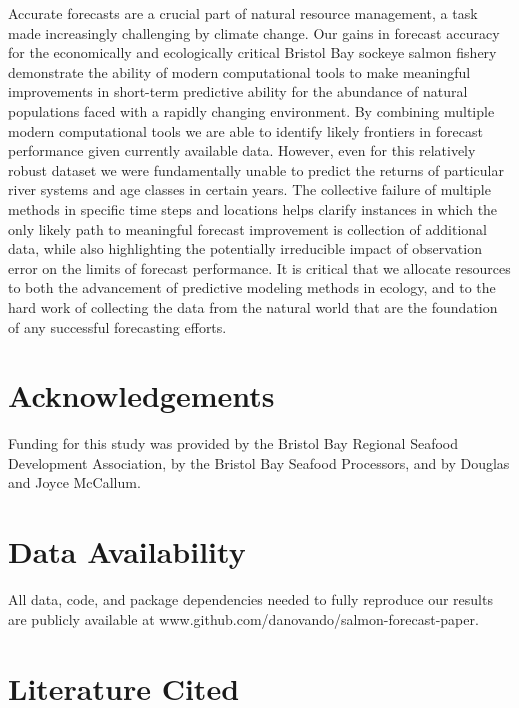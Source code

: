 \documentclass[
]{article}
\begin{document}
Accurate forecasts are a crucial part of natural resource management, a task made increasingly challenging by climate change. Our gains in forecast accuracy for the economically and ecologically critical Bristol Bay sockeye salmon fishery demonstrate the ability of modern computational tools to make meaningful improvements in short-term predictive ability for the abundance of natural populations faced with a rapidly changing environment. By combining multiple modern computational tools we are able to identify likely frontiers in forecast performance given currently available data. However, even for this relatively robust dataset we were fundamentally unable to predict the returns of particular river systems and age classes in certain years. The collective failure of multiple methods in specific time steps and locations helps clarify instances in which the only likely path to meaningful forecast improvement is collection of additional data, while also highlighting the potentially irreducible impact of observation error on the limits of forecast performance. It is critical that we allocate resources to both the advancement of predictive modeling methods in ecology, and to the hard work of collecting the data from the natural world that are the foundation of any successful forecasting efforts.

\hypertarget{acknowledgements}{%
\section*{Acknowledgements}\label{acknowledgements}}

Funding for this study was provided by the Bristol Bay Regional Seafood Development Association, by the Bristol Bay Seafood Processors, and by Douglas and Joyce McCallum.

\hypertarget{data-availability}{%
\section*{Data Availability}\label{data-availability}}

All data, code, and package dependencies needed to fully reproduce our results are publicly available at www.github.com/danovando/salmon-forecast-paper.

\hypertarget{literature-cited}{%
\section*{Literature Cited}\label{literature-cited}}
\end{document}

